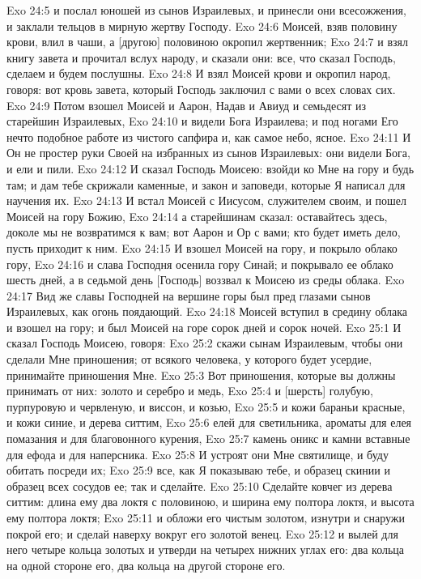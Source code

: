 Exo 24:5  и послал юношей из сынов Израилевых, и принесли они всесожжения, и заклали тельцов в мирную жертву Господу.
Exo 24:6  Моисей, взяв половину крови, влил в чаши, а [другою] половиною окропил жертвенник;
Exo 24:7  и взял книгу завета и прочитал вслух народу, и сказали они: все, что сказал Господь, сделаем и будем послушны.
Exo 24:8  И взял Моисей крови и окропил народ, говоря: вот кровь завета, который Господь заключил с вами о всех словах сих.
Exo 24:9  Потом взошел Моисей и Аарон, Надав и Авиуд и семьдесят из старейшин Израилевых,
Exo 24:10  и видели Бога Израилева; и под ногами Его нечто подобное работе из чистого сапфира и, как самое небо, ясное.
Exo 24:11  И Он не простер руки Своей на избранных из сынов Израилевых: они видели Бога, и ели и пили.
Exo 24:12  И сказал Господь Моисею: взойди ко Мне на гору и будь там; и дам тебе скрижали каменные, и закон и заповеди, которые Я написал для научения их.
Exo 24:13  И встал Моисей с Иисусом, служителем своим, и пошел Моисей на гору Божию,
Exo 24:14  а старейшинам сказал: оставайтесь здесь, доколе мы не возвратимся к вам; вот Аарон и Ор с вами; кто будет иметь дело, пусть приходит к ним.
Exo 24:15  И взошел Моисей на гору, и покрыло облако гору,
Exo 24:16  и слава Господня осенила гору Синай; и покрывало ее облако шесть дней, а в седьмой день [Господь] воззвал к Моисею из среды облака.
Exo 24:17  Вид же славы Господней на вершине горы был пред глазами сынов Израилевых, как огонь поядающий.
Exo 24:18  Моисей вступил в средину облака и взошел на гору; и был Моисей на горе сорок дней и сорок ночей.
Exo 25:1  И сказал Господь Моисею, говоря:
Exo 25:2  скажи сынам Израилевым, чтобы они сделали Мне приношения; от всякого человека, у которого будет усердие, принимайте приношения Мне.
Exo 25:3  Вот приношения, которые вы должны принимать от них: золото и серебро и медь,
Exo 25:4  и [шерсть] голубую, пурпуровую и червленую, и виссон, и козью,
Exo 25:5  и кожи бараньи красные, и кожи синие, и дерева ситтим,
Exo 25:6  елей для светильника, ароматы для елея помазания и для благовонного курения,
Exo 25:7  камень оникс и камни вставные для ефода и для наперсника.
Exo 25:8  И устроят они Мне святилище, и буду обитать посреди их;
Exo 25:9  все, как Я показываю тебе, и образец скинии и образец всех сосудов ее; так и сделайте.
Exo 25:10  Сделайте ковчег из дерева ситтим: длина ему два локтя с половиною, и ширина ему полтора локтя, и высота ему полтора локтя;
Exo 25:11  и обложи его чистым золотом, изнутри и снаружи покрой его; и сделай наверху вокруг его золотой венец.
Exo 25:12  и вылей для него четыре кольца золотых и утверди на четырех нижних углах его: два кольца на одной стороне его, два кольца на другой стороне его.
